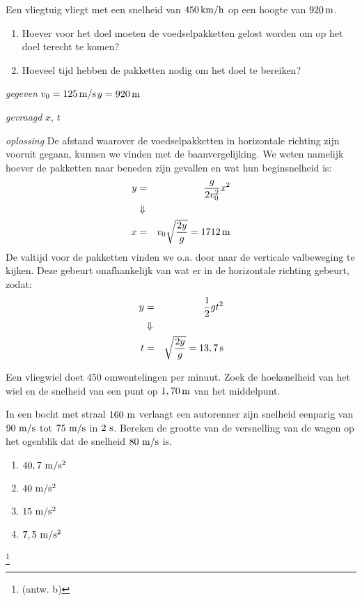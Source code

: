 \begin{exercise}[Opgave] Een vliegtuig vliegt met een snelheid van $450\rm\,km/h$ op een hoogte van $920\rm\,m$.
\begin{enumerate}
\item Hoever voor het doel moeten de voedselpakketten gelost worden om op het doel terecht te komen?
\item Hoeveel tijd hebben de pakketten nodig om het doel te bereiken?
\end{enumerate}
\begin{oplossing}
\textit{gegeven}  $v_0=125\rm\,m/s$\newline$y=920\rm\,m$

\textit{gevraagd} $x$, $t$

\textit{oplossing} De afstand waarover de voedselpakketten in
horizontale richting zijn vooruit gegaan, kunnen we vinden met de
baanvergelijking. We weten namelijk hoever de pakketten naar beneden
zijn gevallen en wat hun beginsnelheid is:
\begin{eqnarray*}
y&=&\frac{g}{2v_0^2}x^2\\
&\Downarrow&\\
x&=&v_0\sqrt{\frac{2y}{g}}=1712\rm\,m
\end{eqnarray*}
De valtijd voor de pakketten vinden we o.a. door naar de verticale
valbeweging te kijken. Deze gebeurt onafhankelijk van wat er in de
horizontale richting gebeurt, zodat:
\begin{eqnarray*}
y&=&\frac{1}{2}gt^2\\
&\Downarrow&\\
t&=&\sqrt{\frac{2y}{g}}=13,7\rm\,s
\end{eqnarray*}
\end{oplossing}









\end{exercise}

\begin{exercise} Een vliegwiel doet 450 omwentelingen per minuut. Zoek de hoeksnelheid van het wiel en de snelheid van een punt op $1,70\rm\,m$ van het middelpunt.

\end{exercise}

\begin{exercise} In een bocht met straal $160~\rm m$ verlaagt een autorenner
zijn snelheid eenparig van $90~\rm m/s$ tot $75~\rm m/s$ in $2~\rm
s$. Bereken de grootte van de versnelling van de wagen op het
ogenblik dat de snelheid $80~\rm m/s$ is.
\begin{enumerate}
\item $40,7~\rm m/s^2$
\item $40~\rm m/s^2$
\item $15~\rm m/s^2$
\item $7,5~\rm m/s^2$
\end{enumerate}
\footnote{(antw. b)}

\end{exercise}

